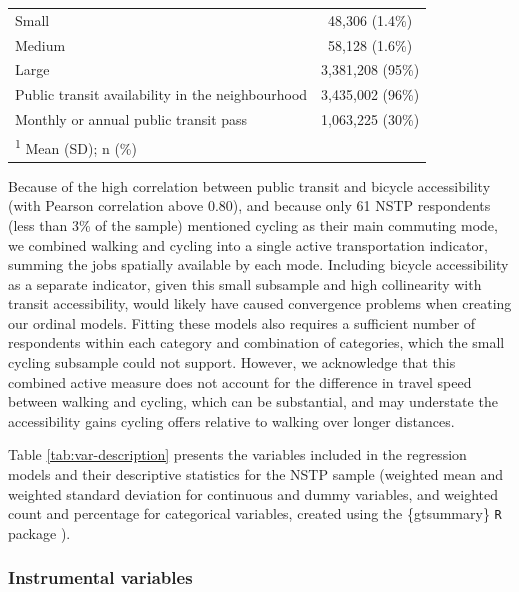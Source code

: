 \documentclass[preprint, 3p,
authoryear]{elsarticle} %
\begin{document}
\begin{table}
\begin{tabular}[t]{lc}
\hspace{1em}Small & 48,306 (1.4\%)\\
\hspace{1em}Medium & 58,128 (1.6\%)\\
\hspace{1em}Large & 3,381,208 (95\%)\\
\addlinespace
Public transit availability in the neighbourhood & 3,435,002 (96\%)\\
Monthly or annual public transit pass & 1,063,225 (30\%)\\
\bottomrule
\multicolumn{2}{l}{\rule{0pt}{1em}\textsuperscript{1} Mean (SD); n (\%)}\\
\end{tabular}
\end{table}

Because of the high correlation between public transit and bicycle
accessibility (with Pearson correlation above 0.80), and because only 61
NSTP respondents (less than 3\% of the sample) mentioned cycling as
their main commuting mode, we combined walking and cycling into a single
active transportation indicator, summing the jobs spatially available by
each mode. Including bicycle accessibility as a separate indicator,
given this small subsample and high collinearity with transit
accessibility, would likely have caused convergence problems when
creating our ordinal models. Fitting these models also requires a
sufficient number of respondents within each category and combination of
categories, which the small cycling subsample could not support.
However, we acknowledge that this combined active measure does not
account for the difference in travel speed between walking and cycling,
which can be substantial, and may understate the accessibility gains
cycling offers relative to walking over longer distances.

Table \ref{tab:var-description} presents the variables included in the
regression models and their descriptive statistics for the NSTP sample
(weighted mean and weighted standard deviation for continuous and dummy
variables, and weighted count and percentage for categorical variables,
created using the \{gtsummary\} \texttt{R} package \citep{gtsummary}).

\subsubsection{Instrumental variables}\label{instrumental-variables}
\end{document}
